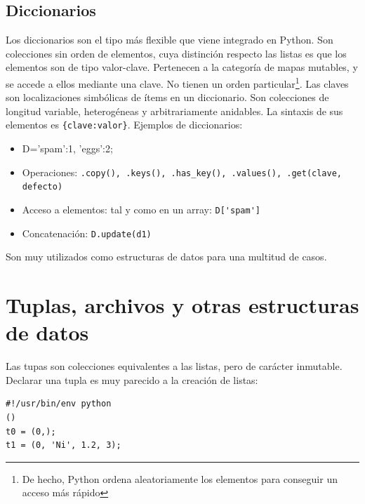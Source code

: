 \documentclass[12pt]{article} %
\begin{document}
\subsection{Diccionarios}
Los diccionarios son el tipo más flexible que viene integrado en Python. Son colecciones sin orden de elementos, cuya distinción respecto las listas es que los elementos son de tipo valor-clave. Pertenecen a la categoría de mapas mutables, y se accede a ellos mediante una clave. No tienen un orden particular\footnote{De hecho, Python ordena aleatoriamente los elementos para conseguir un acceso más rápido}. Las claves son localizaciones simbólicas de ítems en un diccionario.
Son colecciones de longitud variable, heterogéneas y arbitrariamente anidables.
La sintaxis de sus elementos es \verb+{clave:valor}+. Ejemplos de diccionarios:
\begin{itemize}
	\item D={'spam':1, 'eggs':2};
	\item Operaciones: \verb+.copy(), .keys(), .has_key(), .values(), .get(clave, defecto)+
	\item Acceso a elementos: tal y como en un array: \verb+D['spam']+
	\item Concatenación: \verb+D.update(d1)+
\end{itemize}
Son muy utilizados como estructuras de datos para una multitud de casos.

\section{Tuplas, archivos y otras estructuras de datos}
Las tupas son colecciones equivalentes a las listas, pero de carácter inmutable. Declarar una tupla es muy parecido a la creación de listas:
\begin{lstlisting}[frame=single, showspaces=false]
#!/usr/bin/env python
() 
t0 = (0,);
t1 = (0, 'Ni', 1.2, 3);
\end{lstlisting}
\end{document}
